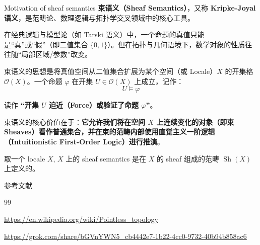 \documentclass{beamer}
\begin{document}
\begin{frame}{Motivation of sheaf semantics}
\textbf{束语义（Sheaf Semantics）}，又称 \textbf{Kripke-Joyal 语义}，是范畴论、数理逻辑与拓扑学交叉领域中的核心工具。

在经典逻辑与模型论（如 Tarski 语义）中，一个命题的真值只能是``真''或``假''（即二值集合 \(\{0, 1\}\)）。但在拓扑与几何语境下，数学对象的性质往往随``局部区域/参数''改变。

束语义的思想是将真值空间从二值集合扩展为某个空间（或 Locale）\(X\) 的开集格 \(\mathcal{O}(X)\)。一个命题 \(\varphi\) 在开集 \(U \in \mathcal{O}(X)\) 上成立，记作：
\[
U \models \varphi
\]

读作 \textbf{``开集 \(U\) 迫近（Force）或验证了命题 \(\varphi\)''}。

束语义的核心价值在于：\textbf{它允许我们将在空间 \(X\) 上连续变化的对象（即束 Sheaves）看作普通集合，并在束的范畴内部使用直觉主义一阶逻辑（Intuitionistic First-Order Logic）进行推演}。
\end{frame}

\begin{frame}
取一个 locale $X$, $X$ 上的 sheaf semantics 是在 $X$ 的 sheaf 组成的范畴 $\mathop{Sh}(X)$ 上定义的。
\end{frame}

\begin{frame}[allowframebreaks]{参考文献}
\begin{thebibliography}{99}

\url{https://en.wikipedia.org/wiki/Pointless_topology}

\url{https://grok.com/share/bGVnYWN5_cb4442e7-1b22-4cc0-9732-40b94b858ac6}

\end{thebibliography}
\end{frame}
\end{document}
